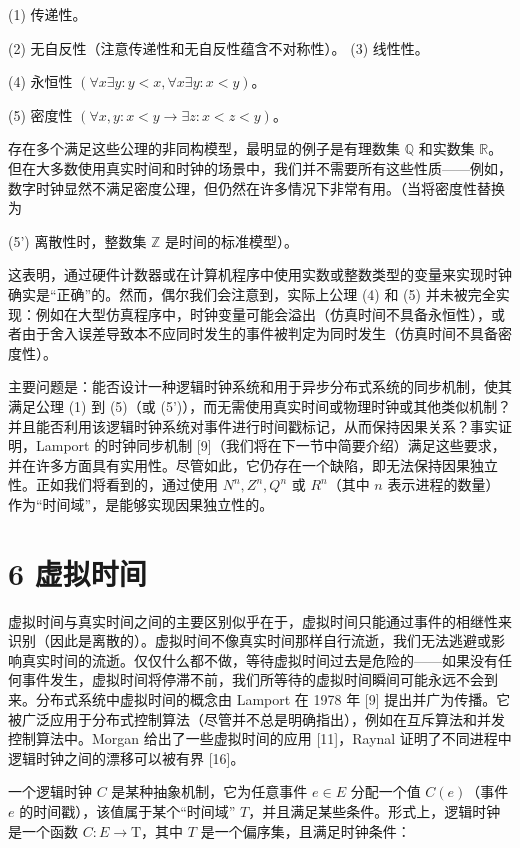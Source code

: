 \documentclass[12pt,a4paper]{report} %
\begin{document}
(1) 传递性。

(2) 无自反性（注意传递性和无自反性蕴含不对称性）。
(3) 线性性。

(4) 永恒性 $(\forall x \exists y: y<x, \forall x \exists y: x<y)$。

(5) 密度性 $(\forall x, y: x<y \rightarrow \exists z: x<z<y)$。

存在多个满足这些公理的非同构模型，最明显的例子是有理数集 $\mathbb{Q}$ 和实数集 $\mathbb{R}$。但在大多数使用真实时间和时钟的场景中，我们并不需要所有这些性质——例如，数字时钟显然不满足密度公理，但仍然在许多情况下非常有用。（当将密度性替换为

(5') 离散性时，整数集 $\mathbb{Z}$ 是时间的标准模型）。

这表明，通过硬件计数器或在计算机程序中使用实数或整数类型的变量来实现时钟确实是“正确”的。然而，偶尔我们会注意到，实际上公理 (4) 和 (5) 并未被完全实现：例如在大型仿真程序中，时钟变量可能会溢出（仿真时间不具备永恒性），或者由于舍入误差导致本不应同时发生的事件被判定为同时发生（仿真时间不具备密度性）。

主要问题是：能否设计一种逻辑时钟系统和用于异步分布式系统的同步机制，使其满足公理 (1) 到 (5)（或 (5')），而无需使用真实时间或物理时钟或其他类似机制？并且能否利用该逻辑时钟系统对事件进行时间戳标记，从而保持因果关系？事实证明，Lamport 的时钟同步机制 [9]（我们将在下一节中简要介绍）满足这些要求，并在许多方面具有实用性。尽管如此，它仍存在一个缺陷，即无法保持因果独立性。正如我们将看到的，通过使用 $N^{n}, Z^{n}, Q^{n}$ 或 $R^{n}$（其中 $n$ 表示进程的数量）作为“时间域”，是能够实现因果独立性的。

\section*{6 虚拟时间}

虚拟时间与真实时间之间的主要区别似乎在于，虚拟时间只能通过事件的相继性来识别（因此是离散的）。虚拟时间不像真实时间那样自行流逝，我们无法逃避或影响真实时间的流逝。仅仅什么都不做，等待虚拟时间过去是危险的——如果没有任何事件发生，虚拟时间将停滞不前，我们所等待的虚拟时间瞬间可能永远不会到来。分布式系统中虚拟时间的概念由 Lamport 在 1978 年 [9] 提出并广为传播。它被广泛应用于分布式控制算法（尽管并不总是明确指出），例如在互斥算法和并发控制算法中。Morgan 给出了一些虚拟时间的应用 [11]，Raynal 证明了不同进程中逻辑时钟之间的漂移可以被有界 [16]。

一个逻辑时钟 $C$ 是某种抽象机制，它为任意事件 $e \in E$ 分配一个值 $C(e)$（事件 $e$ 的时间戳），该值属于某个“时间域” $T$，并且满足某些条件。形式上，逻辑时钟是一个函数 $C: E \rightarrow \mathrm{T}$，其中 $T$ 是一个偏序集，且满足时钟条件：
\end{document}
